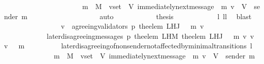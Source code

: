 \begin{isabellebody}
\ \ \ \ \ \ \ \ \ \ \ \ \ \ \ \ \ \ {\isacartoucheopen}{\isasymsigma}\ {\isasymin}\ {\isasymSigma}\ {\isasymand}\ m\ {\isasymin}\ M\ {\isasymand}\ v{\isacharunderscore}set\ {\isasymsubseteq}\ V{\isacartoucheclose}\ {\isacartoucheopen}immediately{\isacharunderscore}next{\isacharunderscore}message\ {\isacharparenleft}{\isasymsigma}{\isacharcomma}\ m{\isacharparenright}{\isacartoucheclose}\ {\isacartoucheopen}v{\isacharprime}\ {\isasymin}\ V\ {\isacharminus}\ {\isacharbraceleft}sender\ m{\isacharbraceright}{\isacartoucheclose}\isanewline
\ \ \ \ \ \ \ \ \ \ \ \ \ \ \ \ \ \ \isamarkupfalse%
\ auto\isanewline
\ \ \ \ \ \ \ \ \isamarkupfalse%
\ \isamarkupfalse%
\ {\isacharquery}thesis\isanewline
\ \ \ \ \ \ \ \ \ \ \isamarkupfalse%
\ l{}\ ll{}\ \isamarkupfalse%
\ blast\ \ \isanewline
\ \ \ \ \ \ \ \ \isamarkupfalse%
\isanewline
\ \ \ \ \isamarkupfalse%
\ \isamarkupfalse%
\ {\isachardoublequoteopen}v{\isacharprime}\ {\isasymin}\ agreeing{\isacharunderscore}validators\ {\isacharparenleft}p{\isacharcomma}\ the{\isacharunderscore}elem\ {\isacharparenleft}L{\isacharunderscore}H{\isacharunderscore}J\ {\isacharparenleft}{\isasymsigma}\ {\isasymunion}\ {\isacharbraceleft}m{\isacharbraceright}{\isacharparenright}\ v{\isacharparenright}{\isacharparenright}\ {\isasymand}\isanewline
\ \ \ \ \ \ \ \ \ \ \ \ later{\isacharunderscore}disagreeing{\isacharunderscore}messages\ {\isacharparenleft}p{\isacharcomma}\ the{\isacharunderscore}elem\ {\isacharparenleft}L{\isacharunderscore}H{\isacharunderscore}M\ {\isacharparenleft}the{\isacharunderscore}elem\ {\isacharparenleft}L{\isacharunderscore}H{\isacharunderscore}J\ {\isacharparenleft}{\isasymsigma}\ {\isasymunion}\ {\isacharbraceleft}m{\isacharbraceright}{\isacharparenright}\ v{\isacharparenright}{\isacharparenright}\ v{\isacharprime}{\isacharparenright}{\isacharcomma}\ v{\isacharprime}{\isacharcomma}\ {\isasymsigma}\ {\isasymunion}\ {\isacharbraceleft}m{\isacharbraceright}{\isacharparenright}\ {\isacharequal}\ {\isasymemptyset}{\isachardoublequoteclose}\isanewline
\ \ \ \ \ \ \isamarkupfalse%
\ later{\isacharunderscore}disagreeing{\isacharunderscore}of{\isacharunderscore}non{\isacharunderscore}sender{\isacharunderscore}not{\isacharunderscore}affected{\isacharunderscore}by{\isacharunderscore}minimal{\isacharunderscore}transitions\ l{}\isanewline
\ \ \ \ \ \ \ \ \ \ {\isacartoucheopen}{\isasymsigma}\ {\isasymin}\ {\isasymSigma}\ {\isasymand}\ m\ {\isasymin}\ M\ {\isasymand}\ v{\isacharunderscore}set\ {\isasymsubseteq}\ V{\isacartoucheclose}\ {\isacartoucheopen}immediately{\isacharunderscore}next{\isacharunderscore}message\ {\isacharparenleft}{\isasymsigma}{\isacharcomma}\ m{\isacharparenright}{\isacartoucheclose}\ {\isacartoucheopen}v{\isacharprime}\ {\isasymin}\ V\ {\isacharminus}\ {\isacharbraceleft}sender\ m{\isacharbraceright}{\isacartoucheclose}\isanewline

\end{isabellebody}
